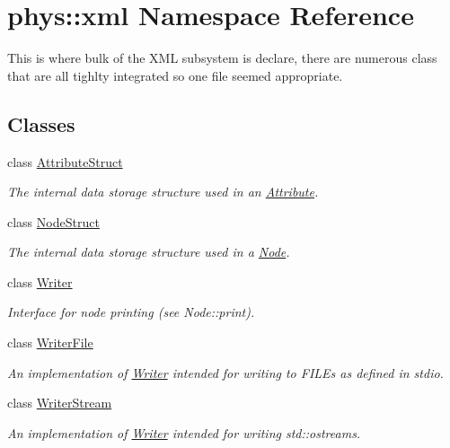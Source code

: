 \hypertarget{namespacephys_1_1xml}{
\section{phys::xml Namespace Reference}
\label{d9/d27/namespacephys_1_1xml}
}


This is where bulk of the XML subsystem is declare, there are numerous class that are all tighlty integrated so one file seemed appropriate.  


\subsection*{Classes}
\begin{DoxyCompactItemize}
\item 
class \hyperlink{structphys_1_1xml_1_1AttributeStruct}{AttributeStruct}
\begin{DoxyCompactList}\small\item\em The internal data storage structure used in an \hyperlink{classphys_1_1xml_1_1Attribute}{Attribute}. \item\end{DoxyCompactList}\item 
class \hyperlink{structphys_1_1xml_1_1NodeStruct}{NodeStruct}
\begin{DoxyCompactList}\small\item\em The internal data storage structure used in a \hyperlink{classphys_1_1xml_1_1Node}{Node}. \item\end{DoxyCompactList}\item 
class \hyperlink{classphys_1_1xml_1_1Writer}{Writer}
\begin{DoxyCompactList}\small\item\em Interface for node printing (see Node::print). \item\end{DoxyCompactList}\item 
class \hyperlink{classphys_1_1xml_1_1WriterFile}{WriterFile}
\begin{DoxyCompactList}\small\item\em An implementation of \hyperlink{classphys_1_1xml_1_1Writer}{Writer} intended for writing to FILEs as defined in stdio. \item\end{DoxyCompactList}\item 
class \hyperlink{classphys_1_1xml_1_1WriterStream}{WriterStream}
\begin{DoxyCompactList}\small\item\em An implementation of \hyperlink{classphys_1_1xml_1_1Writer}{Writer} intended for writing std::ostreams. \item\end{DoxyCompactList}\item 

\end{DoxyCompactItemize}
